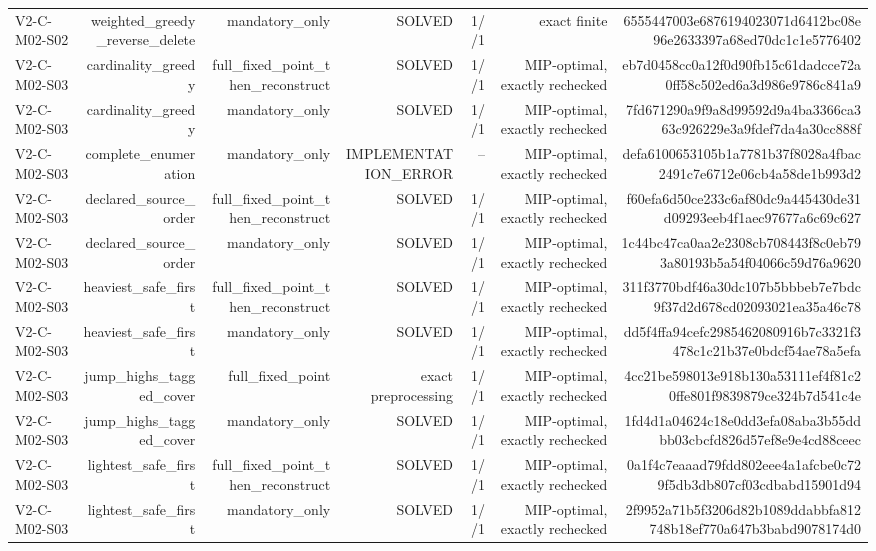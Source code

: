 {\begin{longtable}{lrrrrrr}
V2-C-M02-S02 & weighted\_greedy\_reverse\_delete & mandatory\_only & SOLVED & 1//1 & exact finite & 6555447003e6876194023071d6412bc08e96e2633397a68ed70dc1c1e5776402 \\
V2-C-M02-S03 & cardinality\_greedy & full\_fixed\_point\_then\_reconstruct & SOLVED & 1//1 & MIP-optimal, exactly rechecked & eb7d0458cc0a12f0d90fb15c61dadcce72a0ff58c502ed6a3d986e9786c841a9 \\
V2-C-M02-S03 & cardinality\_greedy & mandatory\_only & SOLVED & 1//1 & MIP-optimal, exactly rechecked & 7fd671290a9f9a8d99592d9a4ba3366ca363c926229e3a9fdef7da4a30cc888f \\
V2-C-M02-S03 & complete\_enumeration & mandatory\_only & IMPLEMENTATION\_ERROR & -- & MIP-optimal, exactly rechecked & defa6100653105b1a7781b37f8028a4fbac2491c7e6712e06cb4a58de1b993d2 \\
V2-C-M02-S03 & declared\_source\_order & full\_fixed\_point\_then\_reconstruct & SOLVED & 1//1 & MIP-optimal, exactly rechecked & f60efa6d50ce233c6af80dc9a445430de31d09293eeb4f1aec97677a6c69c627 \\
V2-C-M02-S03 & declared\_source\_order & mandatory\_only & SOLVED & 1//1 & MIP-optimal, exactly rechecked & 1c44bc47ca0aa2e2308cb708443f8c0eb793a80193b5a54f04066c59d76a9620 \\
V2-C-M02-S03 & heaviest\_safe\_first & full\_fixed\_point\_then\_reconstruct & SOLVED & 1//1 & MIP-optimal, exactly rechecked & 311f3770bdf46a30dc107b5bbbeb7e7bdc9f37d2d678cd02093021ea35a46c78 \\
V2-C-M02-S03 & heaviest\_safe\_first & mandatory\_only & SOLVED & 1//1 & MIP-optimal, exactly rechecked & dd5f4ffa94cefc2985462080916b7c3321f3478c1c21b37e0bdcf54ae78a5efa \\
V2-C-M02-S03 & jump\_highs\_tagged\_cover & full\_fixed\_point & exact preprocessing & 1//1 & MIP-optimal, exactly rechecked & 4cc21be598013e918b130a53111ef4f81c20ffe801f9839879ce324b7d541c4e \\
V2-C-M02-S03 & jump\_highs\_tagged\_cover & mandatory\_only & SOLVED & 1//1 & MIP-optimal, exactly rechecked & 1fd4d1a04624c18e0dd3efa08aba3b55ddbb03cbcfd826d57ef8e9e4cd88ceec \\
V2-C-M02-S03 & lightest\_safe\_first & full\_fixed\_point\_then\_reconstruct & SOLVED & 1//1 & MIP-optimal, exactly rechecked & 0a1f4c7eaaad79fdd802eee4a1afcbe0c729f5db3db807cf03cdbabd15901d94 \\
V2-C-M02-S03 & lightest\_safe\_first & mandatory\_only & SOLVED & 1//1 & MIP-optimal, exactly rechecked & 2f9952a71b5f3206d82b1089ddabbfa812748b18ef770a647b3babd9078174d0 \\

\end{longtable}}
